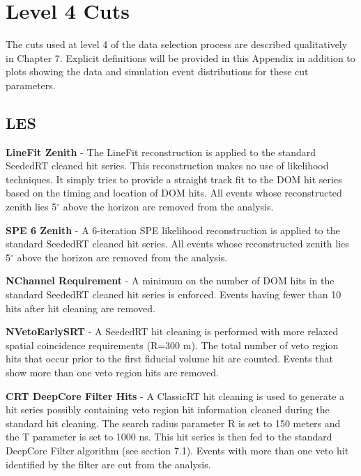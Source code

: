 \documentclass{gatech-thesis}
\begin{document}
\pagebreak

\section{Level 4 Cuts}
The cuts used at level 4 of the data selection process are described qualitatively in Chapter 7. Explicit definitions will be provided in this Appendix in addition to plots showing the data and simulation event distributions for these cut parameters.
\subsection{LES}
\begin{adjustwidth}{1.5em}{1.5em}
\setlength{\parindent}{0pt}
\textbf{LineFit Zenith} - The LineFit reconstruction is applied to the standard SeededRT cleaned hit series. This reconstruction makes no use of likelihood techniques. It simply tries to provide a straight track fit to the DOM hit series based on the timing and location of DOM hits. All events whose reconstructed zenith lies 5$^{\circ}$ above the horizon are removed from the analysis.

\textbf{SPE 6 Zenith} - A 6-iteration SPE likelihood reconstruction is applied to the standard SeededRT cleaned hit series. All events whose reconstructed zenith lies 5$^{\circ}$ above the horizon are removed from the analysis.

\textbf{NChannel Requirement} - A minimum on the number of DOM hits in the standard SeededRT cleaned hit series is enforced. Events having fewer than 10 hits after hit cleaning are removed.

\textbf{NVetoEarlySRT} - A SeededRT hit cleaning is performed with more relaxed spatial coincidence requirements (R=300 m). The total number of veto region hits that occur prior to the first fiducial volume hit are counted. Events that show more than one veto region hits are removed.

\textbf{CRT DeepCore Filter Hits} - A ClassicRT hit cleaning is used to generate a hit series possibly containing veto region hit information cleaned during the standard hit cleaning. The search radius parameter R is set to 150 meters and the T parameter is set to 1000 ns. This hit series is then fed to the standard DeepCore Filter algorithm (see section 7.1). Events with more than one veto hit identified by the filter are cut from the analysis.
\end{adjustwidth}
\setlength{\parindent}{17.5pt}
\end{document}
